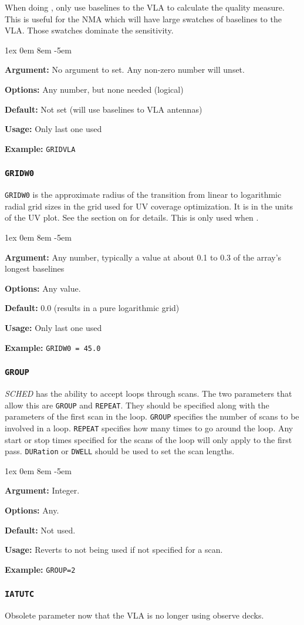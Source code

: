 \documentclass{report}
\newcommand{\rcwbox}[5]{
  \begin{list}{}{\parsep 1ex  \itemsep 0em
                 \leftmargin 8em  \itemindent -5em }
    \item {\bf Argument:} #1
    \item {\bf Options:}  #2
    \item {\bf Default:}  #3
    \item {\bf Usage:}    #4
    \item {\bf Example:}  #5
  \end{list}
}
\begin{document}
When doing , only use baselines
to the VLA to calculate the quality measure.  This is useful for the NMA
which will have large swatches of baselines to the VLA.  Those swatches
dominate the sensitivity.

\rcwbox
{No argument to set.  Any non-zero number will unset.}
{Any number, but none needed (logical)}
{Not set (will use baselines to VLA antennas)}
{Only last one used}
{{\tt GRIDVLA}}

\subsubsection{\label{MP:GRIDW0}{\tt GRIDW0}}

{\tt GRIDW0} is the approximate radius of the transition
from linear to logarithmic radial grid sizes in the grid used for UV
coverage optimization.  It is in the units of the UV plot.
See the section on  for details.  This is only used when
.

\rcwbox
{Any number, typically a value at about 0.1 to 0.3 of the array's longest
baselines}
{Any value.}
{0.0 (results in a pure logarithmic grid)}
{Only last one used}
{{\tt GRIDW0 = 45.0}}


\subsubsection{\label{MP:GROUP}{\tt GROUP}}

{\em SCHED} has the ability to accept loops through scans.  The two
parameters that allow this are {\tt GROUP} and {\tt REPEAT}.  They
should be specified along with the parameters of the first scan in the
loop.  {\tt GROUP} specifies the number of scans to be involved in a
loop.  {\tt REPEAT} specifies how many times to go around the loop.
Any start or stop times specified for the scans of the loop will
only apply to the first pass.  {\tt DURation} or {\tt DWELL} should
be used to set the scan lengths.

\rcwbox
{Integer.}
{Any.}
{Not used.}
{Reverts to not being used if not specified for a scan.}
{{\tt GROUP=2}}


\subsubsection{\label{MP:IATUTC}{\tt IATUTC}}

Obsolete parameter now that the VLA is no longer using observe decks.
\end{document}
